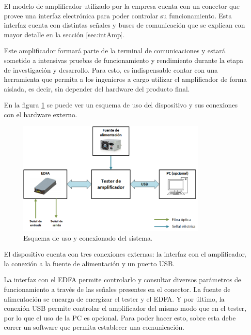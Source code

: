El modelo de amplificador utilizado por la empresa cuenta con un conector que provee una interfaz electrónica para poder controlar su funcionamiento. Esta interfaz cuenta con distintas señales y buses de comunicación que se explican con mayor detalle en la sección \ref{sec:intAmp}.

Este amplificador formará parte de la terminal de comunicaciones y estará sometido a intensivas pruebas de funcionamiento y rendimiento durante la etapa de investigación y desarrollo. Para esto, es indispensable contar con una herramienta que permita a los ingenieros a cargo utilizar el amplificador de forma aislada, es decir, sin depender del hardware del producto final.

En la figura \ref{fig:bloquesProy} se puede ver un esquema de uso del dispositivo y sus conexiones con el hardware externo.

\begin{figure}[H]
\centering
\includegraphics[width=0.85\textwidth]{./Figures/bloquesProy.png}
\caption{Esquema de uso y conexionado del sistema.}
\label{fig:bloquesProy}
\end{figure}

El dispositivo cuenta con tres conexiones externas: la interfaz con el amplificador, la conexión a la fuente de alimentación y un puerto USB.

La interfaz con el EDFA permite controlarlo y consultar diversos parámetros de funcionamiento a través de las señales presentes en el conector. La fuente de alimentación se encarga de energizar el tester y el EDFA. Y por último, la conexión USB permite controlar el amplificador del mismo modo que en el tester, por lo que el uso de la PC es opcional. Para poder hacer esto, sobre esta debe correr un software que permita establecer una comunicación.


